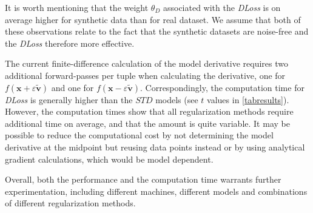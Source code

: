 \documentclass[conference]{IEEEtran}
\begin{document}
It is worth mentioning that the weight $\theta_{D}$ associated with the \emph{DLoss} is on average higher for synthetic data than for real dataset.
We assume that both of these observations relate to the fact that the synthetic datasets are noise-free and the \emph{DLoss} therefore more effective. 

The current finite-difference calculation of the model derivative requires two additional forward-passes per tuple when calculating the derivative, one for $f(\mathbf{x}+\varepsilon\tilde{\mathbf{v}})$ and one for $f(\mathbf{x}-\varepsilon\tilde{\mathbf{v}})$. 
Correspondingly, the computation time for \emph{DLoss} is generally higher than the $STD$ models (see $t$ values in \autoref{tabresults}).
However, the computation times show that all regularization methods require additional time on average, and that the amount is quite variable.
It may be possible to reduce the computational cost by not determining the model derivative at the midpoint but reusing data points instead or by using analytical gradient calculations, which would be model dependent. 

Overall, both the performance and the computation time warrants further experimentation, including different machines, different models and combinations of different regularization methods. 
\end{document}
